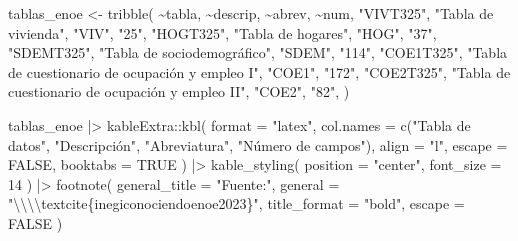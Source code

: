 \documentclass[
  spanish,
  letterpaper,
  DIV=11,
  numbers=noendperiod]{scrartcl}
\newenvironment{Shaded}{\begin{snugshade}}{\end{snugshade}}
\newcommand{\AttributeTok}[1]{\textcolor[rgb]{0.40,0.45,0.13}{#1}}
\newcommand{\ConstantTok}[1]{\textcolor[rgb]{0.56,0.35,0.01}{#1}}
\newcommand{\DecValTok}[1]{\textcolor[rgb]{0.68,0.00,0.00}{#1}}
\newcommand{\FunctionTok}[1]{\textcolor[rgb]{0.28,0.35,0.67}{#1}}
\newcommand{\NormalTok}[1]{\textcolor[rgb]{0.00,0.23,0.31}{#1}}
\newcommand{\OtherTok}[1]{\textcolor[rgb]{0.00,0.23,0.31}{#1}}
\newcommand{\SpecialCharTok}[1]{\textcolor[rgb]{0.37,0.37,0.37}{#1}}
\newcommand{\StringTok}[1]{\textcolor[rgb]{0.13,0.47,0.30}{#1}}
\begin{document}
\begin{Shaded}
\begin{Highlighting}[]
\NormalTok{tablas\_enoe }\OtherTok{\textless{}{-}} \FunctionTok{tribble}\NormalTok{(}
  \SpecialCharTok{\textasciitilde{}}\NormalTok{tabla, }\SpecialCharTok{\textasciitilde{}}\NormalTok{descrip, }\SpecialCharTok{\textasciitilde{}}\NormalTok{abrev, }\SpecialCharTok{\textasciitilde{}}\NormalTok{num,}
  \StringTok{"\textasciigrave{}VIVT325\textasciigrave{}"}\NormalTok{, }\StringTok{"Tabla de vivienda"}\NormalTok{, }\StringTok{"\textasciigrave{}VIV\textasciigrave{}"}\NormalTok{, }\StringTok{"25"}\NormalTok{,}
  \StringTok{"\textasciigrave{}HOGT325\textasciigrave{}"}\NormalTok{, }\StringTok{"Tabla de hogares"}\NormalTok{, }\StringTok{"\textasciigrave{}HOG\textasciigrave{}"}\NormalTok{, }\StringTok{"37"}\NormalTok{,}
  \StringTok{"\textasciigrave{}SDEMT325\textasciigrave{}"}\NormalTok{, }\StringTok{"Tabla de sociodemográfico"}\NormalTok{, }\StringTok{"\textasciigrave{}SDEM\textasciigrave{}"}\NormalTok{, }\StringTok{"114"}\NormalTok{,}
  \StringTok{"\textasciigrave{}COE1T325\textasciigrave{}"}\NormalTok{, }\StringTok{"Tabla de cuestionario de ocupación y empleo I"}\NormalTok{, }\StringTok{"\textasciigrave{}COE1\textasciigrave{}"}\NormalTok{, }\StringTok{"172"}\NormalTok{,}
  \StringTok{"\textasciigrave{}COE2T325\textasciigrave{}"}\NormalTok{, }\StringTok{"Tabla de cuestionario de ocupación y empleo II"}\NormalTok{, }\StringTok{"\textasciigrave{}COE2\textasciigrave{}"}\NormalTok{, }\StringTok{"82"}\NormalTok{,}
\NormalTok{)}

\NormalTok{tablas\_enoe }\SpecialCharTok{|\textgreater{}} 
\NormalTok{  kableExtra}\SpecialCharTok{::}\FunctionTok{kbl}\NormalTok{(}
    \AttributeTok{format =} \StringTok{"latex"}\NormalTok{,}
    \AttributeTok{col.names =} \FunctionTok{c}\NormalTok{(}\StringTok{"Tabla de datos"}\NormalTok{, }\StringTok{"Descripción"}\NormalTok{, }\StringTok{"Abreviatura"}\NormalTok{, }\StringTok{"Número de campos"}\NormalTok{),}
    \AttributeTok{align =} \StringTok{"l"}\NormalTok{,}
    \AttributeTok{escape =} \ConstantTok{FALSE}\NormalTok{,}
    \AttributeTok{booktabs =} \ConstantTok{TRUE}
\NormalTok{  ) }\SpecialCharTok{|\textgreater{}} 
  \FunctionTok{kable\_styling}\NormalTok{(}
    \AttributeTok{position =} \StringTok{"center"}\NormalTok{,}
    \AttributeTok{font\_size =} \DecValTok{14}
\NormalTok{  ) }\SpecialCharTok{|\textgreater{}} 
  \FunctionTok{footnote}\NormalTok{(}
    \AttributeTok{general\_title =} \StringTok{"Fuente:"}\NormalTok{,}
    \AttributeTok{general =} \StringTok{"}\SpecialCharTok{\textbackslash{}\textbackslash{}\textbackslash{}\textbackslash{}}\StringTok{textcite\{inegiconociendoenoe2023\}"}\NormalTok{,}
    \AttributeTok{title\_format =} \StringTok{"bold"}\NormalTok{,}
    \AttributeTok{escape =} \ConstantTok{FALSE}
\NormalTok{  )}
\end{Highlighting}
\end{Shaded}
\end{document}
